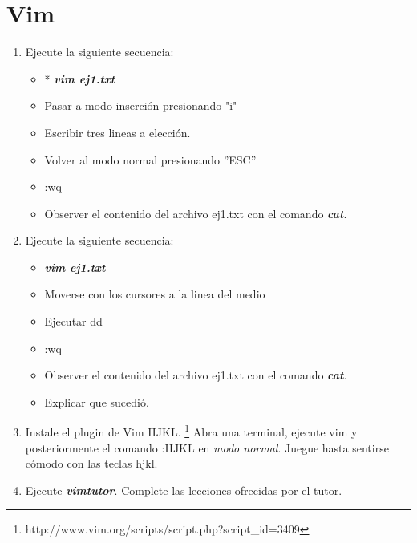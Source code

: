 \documentclass[12pt]{article}
\begin{document}
\section*{Vim}
\begin{enumerate}
\item Ejecute la siguiente secuencia:
	\begin{itemize}
	\item * \textit{\textbf{vim ej1.txt}}
        \item Pasar a modo inserción presionando "i"
        \item Escribir tres lineas a elección. 
        \item Volver al modo normal presionando ''ESC''
        \item :wq
	\item Observer el contenido del archivo ej1.txt con el comando \textbf{\textit{cat}}. 
	\end{itemize}
\item Ejecute la siguiente secuencia:
	\begin{itemize}
        \item \textbf{\textit{vim ej1.txt}}
        \item Moverse con los cursores a la linea del medio
        \item Ejecutar dd
        \item :wq
	\item Observer el contenido del archivo ej1.txt con el comando \textbf{\textit{cat}}. 
        \item Explicar que sucedió. 
	\end{itemize}
\item Instale el plugin de Vim HJKL. 
 \footnote{http://www.vim.org/scripts/script.php?script\_id=3409}
Abra una terminal, ejecute vim y posteriormente el comando :HJKL en \textit{modo normal}. 
Juegue hasta sentirse cómodo con las teclas hjkl. 
\item Ejecute \textbf{\textit{vimtutor}}. Complete las lecciones ofrecidas por el tutor. 
\end{enumerate}
\end{document}
